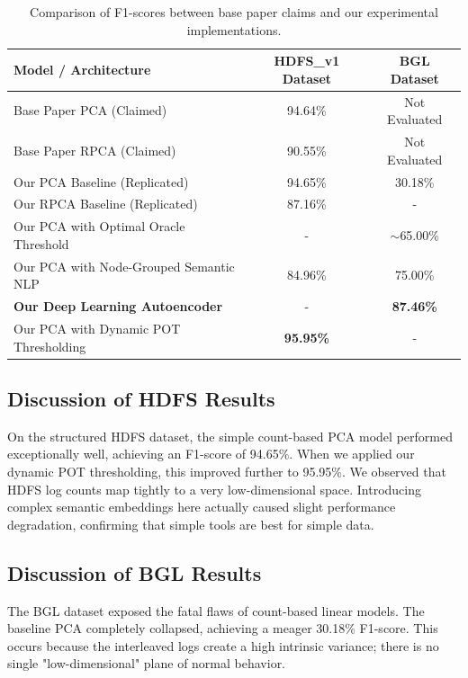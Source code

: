 \documentclass[12pt]{article}
\begin{document}
\begin{table}[H]
    \centering
    \renewcommand{\arraystretch}{1.4}
    \begin{tabular}{|l|c|c|}
        \hline
        \textbf{Model / Architecture} & \textbf{HDFS\_v1 Dataset} & \textbf{BGL Dataset} \\
        \hline
        Base Paper PCA (Claimed) & 94.64\% & Not Evaluated \\
        Base Paper RPCA (Claimed) & 90.55\% & Not Evaluated \\
        \hline
        Our PCA Baseline (Replicated) & 94.65\% & 30.18\% \\
        Our RPCA Baseline (Replicated) & 87.16\% & - \\
        Our PCA with Optimal Oracle Threshold & - & $\sim$65.00\% \\
        \hline
        Our PCA with Node-Grouped Semantic NLP & 84.96\% & 75.00\% \\
        \textbf{Our Deep Learning Autoencoder} & - & \textbf{87.46\%} \\
        Our PCA with Dynamic POT Thresholding & \textbf{95.95\%} & - \\
        \hline
    \end{tabular}
    \vspace{0.2cm}
    \caption{Comparison of F1-scores between base paper claims and our experimental implementations.}
    \label{tab:results}
\end{table}

\subsection{Discussion of HDFS Results}
On the structured HDFS dataset, the simple count-based PCA model performed exceptionally well, achieving an F1-score of 94.65\%. When we applied our dynamic POT thresholding, this improved further to 95.95\%. We observed that HDFS log counts map tightly to a very low-dimensional space. Introducing complex semantic embeddings here actually caused slight performance degradation, confirming that simple tools are best for simple data.

\subsection{Discussion of BGL Results}
The BGL dataset exposed the fatal flaws of count-based linear models. The baseline PCA completely collapsed, achieving a meager 30.18\% F1-score. This occurs because the interleaved logs create a high intrinsic variance; there is no single "low-dimensional" plane of normal behavior. 
\end{document}
